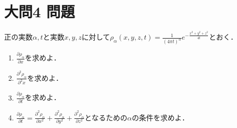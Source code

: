 \documentclass[dvipdfmx]{jsreport}
\begin{document}
\section{大問4 問題}
\begin{tcolorbox} %
	正の実数$\alpha, t$と実数$x, y, z$に対して$\rho_\alpha(x, y, z, t)= \frac{1}{(4\pi t)^\alpha}e^{-\frac{x^2+ y^2+ z^2}{4t}}$とおく．
\begin{enumerate}
	\item $\frac{\partial \rho_\alpha}{\partial x}$を求めよ．
	\item $\frac{\partial^2 \rho_\alpha}{\partial^2 x}$を求めよ．
	\item $\frac{\partial \rho_\alpha}{\partial t}$を求めよ．
	\item $\frac{\partial \rho_\alpha}{\partial t}= \frac{\partial^2 \rho_\alpha}{\partial x^2}+ \frac{\partial^2 \rho_\alpha}{\partial y^2}+ \frac{\partial^2 \rho_\alpha}{\partial z^2}$となるための$\alpha$の条件を求めよ．
\end{enumerate}
\end{tcolorbox}
\end{document}
